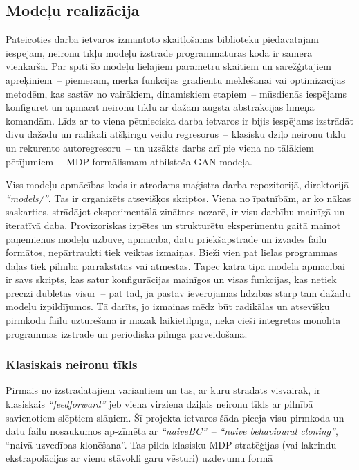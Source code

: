 \documentclass[12pt, a4paper]{article}
\numberwithin{equation}{section} %
\begin{document}
\subsection{Modeļu realizācija}

Pateicoties darba ietvaros izmantoto skaitļošanas bibliotēku piedāvātajām iespējām, neironu tīkļu modeļu izstrāde programmatūras kodā ir samērā vienkārša. Par spīti šo modeļu lielajiem parametru skaitiem un sarežģītajiem aprēķiniem~-- piemēram, mērķa funkcijas gradientu meklēšanai vai optimizācijas metodēm, kas sastāv no vairākiem, dinamiskiem etapiem~-- mūsdienās iespējams konfigurēt un apmācīt neironu tīklu ar dažām augsta abstrakcijas līmeņa komandām. Līdz ar to viena pētnieciska darba ietvaros ir bijis iespējams izstrādāt divu dažādu un radikāli atšķirīgu veidu regresorus~-- klasisku dziļo neironu tīklu un rekurento autoregresoru~-- un uzsākts darbs arī pie viena no tālākiem pētījumiem~-- MDP formālismam atbilstoša GAN modeļa. 

Viss modeļu apmācības kods ir atrodams maģistra darba repozitorijā, direktorijā \textit{``models/''}. Tas ir organizēts atsevišķos skriptos. Viena no īpatnībām, ar ko nākas saskarties, strādājot eksperimentālā zinātnes nozarē, ir visu darbību mainīgā un iteratīvā daba. Provizoriskas izpētes un strukturētu eksperimentu gaitā mainot paņēmienus modeļu uzbūvē, apmācībā, datu priekšapstrādē un izvades failu formātos, nepārtraukti tiek veiktas izmaiņas. Bieži vien pat lielas programmas daļas tiek pilnībā pārrakstītas vai atmestas. Tāpēc katra tipa modeļa apmācībai ir savs skripts, kas satur konfigurācijas mainīgos un visas funkcijas, kas netiek precīzi dublētas visur~-- pat tad, ja pastāv ievērojamas līdzības starp tām dažādu modeļu izpildījumos. Tā darīts, jo izmaiņas mēdz būt radikālas un atsevišķu pirmkoda failu uzturēšana ir mazāk laikietilpīga, nekā cieši integrētas monolīta programmas izstrāde un periodiska pilnīga pārveidošana.

\subsubsection{Klasiskais neironu tīkls}

Pirmais no izstrādātajiem variantiem un tas, ar kuru strādāts visvairāk, ir klasiskais \textit{``feedforward''} jeb viena virziena dziļais neironu tīkls ar pilnībā savienotiem slēptiem slāņiem. Šī projekta ietvaros šāda pieeja visu pirmkoda un datu failu nosaukumos ap-zīmēta ar \textit{``naiveBC''}~-- \textit{``naive behavioural cloning''}, ``naivā uzvedības klonēšana''. Tas pilda klasisku MDP stratēģijas (vai lakrindu ekstrapolācijas ar vienu stāvokli garu vēsturi) uzdevumu formā
\end{document}
